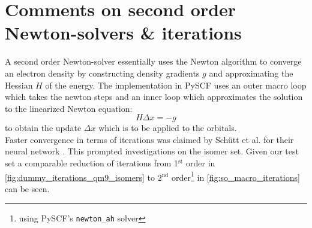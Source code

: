 \section{Comments on second order Newton-solvers \& iterations}
\label{sec:notes_on_so_newton}
A second order Newton-solver essentially uses the Newton algorithm to converge an electron density by constructing density gradients $g$ and approximating the Hessian $H$ of the energy. The implementation in PySCF uses an outer macro loop which takes the newton steps and an inner loop which approximates the solution to the linearized Newton equation:
\[H \Delta x = -g\]
to obtain the update $\Delta x$ which is to be applied to the orbitals.\\

Faster convergence in terms of iterations was claimed by Schütt et al. for their neural network \parencite{ref:schuett_unifying_2019}. This prompted investigations on the  isomer set. Given our test set a comparable reduction of iterations from 1$^\text{st}$ order in \autoref{fig:dummy_iterations_qm9_isomers} to 2$^\text{nd}$ order\footnote{using PySCF's \texttt{newton\_ah} solver} in \autoref{fig:so_macro_iterations} can be seen. 

